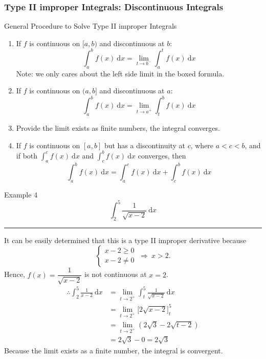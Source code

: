 \documentclass[12pt,a4paper]{article}
\def\d{{\mathrm{d}}}
\begin{document}
\subsubsection{Type II improper Integrals: Discontinuous Integrals}
\begin{thm}{General Procedure to Solve Type II improper Integrals}
	\begin{enumerate}
		\item If $f$ is continuous on $[a, b)$ and discontinuous at $b$: 
		$$\int_a^bf(x)\ \d x=\boxed{\lim_{t\to b^-}\int_a^tf(x)\ \d x}$$
		Note: we only cares about the left side limit in the boxed formula. 
		\item If $f$ is continuous on $(a, b]$ and discontinuous at $a$: 
		$$\int_a^bf(x)\ \d x=\lim_{t\to a^+}\int_t^bf(x)\ \d x$$
		\item Provide the limit exists as finite numbers, the integral converges. 
		\item If $f$ is continuous on $[a, b]$ but has a discontinuity at $c$, where $a<c<b$, and if both $\displaystyle\int_a^cf(x)\ \d x$ and $\displaystyle\int_c^bf(x)\ \d x$ converges, then
		$$\int_a^bf(x)\ \d x = \int_a^cf(x)\ \d x+\int_c^bf(x)\ \d x$$
	\end{enumerate}
\end{thm}
\begin{eg}{Example 4}
	$$\int_2^5\frac{1}{\sqrt{x-2}}\ \d x$$
	\noindent\rule[0.25\baselineskip]{\textwidth}{1pt}
	It can be easily determined that this is a type II improper derivative because $$\begin{cases}x-2\geq0\\x-2\neq0\end{cases}\ \Rightarrow\ x>2.$$
	Hence, $f(x)=\dfrac{1}{\sqrt{x-2}}$ is not continuous at $x=2$.
	$$\begin{aligned}
		\therefore\int_2^5\frac{1}{x-2}\ \d x&=\lim_{t\to2^+}\int_t^5\frac{1}{\sqrt{x-2}}\ \d x\\
		&=\lim_{t\to2^+}\bigg[2\sqrt{x-2}\bigg]^5_t\\
		&=\lim_{t\to2^+}\left(2\sqrt{3}-2\sqrt{t-2}\right)\\
		&=2\sqrt{3}-0=2\sqrt{3}
	\end{aligned}$$
	Because the limit exists as a finite number, the integral is convergent. 
\end{eg}
\end{document}
